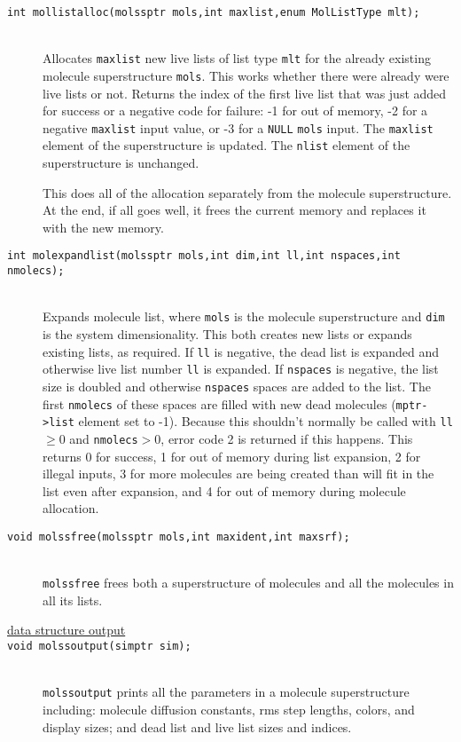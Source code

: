 \documentclass {scrbook}
\newcommand {\ttt} {\texttt}
\begin{document}
\begin{description}
\item[\ttt{int mollistalloc(molssptr mols,int maxlist,enum MolListType mlt);}]
\hfill \\
Allocates \ttt{maxlist} new live lists of list type \ttt{mlt} for the already existing molecule superstructure \ttt{mols}. This works whether there were already were live lists or not. Returns the index of the first live list that was just added for success or a negative code for failure: -1 for out of memory, -2 for a negative \ttt{maxlist} input value, or -3 for a \ttt{NULL} \ttt{mols} input. The \ttt{maxlist} element of the superstructure is updated. The \ttt{nlist} element of the superstructure is unchanged.

This does all of the allocation separately from the molecule superstructure. At the end, if all goes well, it frees the current memory and replaces it with the new memory.

\item[\ttt{int molexpandlist(molssptr mols,int dim,int ll,int nspaces,int nmolecs);}]
\hfill \\
Expands molecule list, where \ttt{mols} is the molecule superstructure and \ttt{dim} is the system dimensionality. This both creates new lists or expands existing lists, as required. If \ttt{ll} is negative, the dead list is expanded and otherwise live list number \ttt{ll} is expanded. If \ttt{nspaces} is negative, the list size is doubled and otherwise \ttt{nspaces} spaces are added to the list. The first \ttt{nmolecs} of these spaces are filled with new dead molecules (\ttt{mptr->list} element set to -1). Because this shouldn't normally be called with \ttt{ll}$\ge$0 and \ttt{nmolecs}$>$0, error code 2 is returned if this happens. This returns 0 for success, 1 for out of memory during list expansion, 2 for illegal inputs, 3 for more molecules are being created than will fit in the list even after expansion, and 4 for out of memory during molecule allocation.

\item[\ttt{void molssfree(molssptr mols,int maxident,int maxsrf);}]
\hfill \\
\ttt{molssfree} frees both a superstructure of molecules and all the molecules in all its lists.

\item[\underline{data structure output}]

\item[\ttt{void molssoutput(simptr sim);}]
\hfill \\
\ttt{molssoutput} prints all the parameters in a molecule superstructure including: molecule diffusion constants, rms step lengths, colors, and display sizes; and dead list and live list sizes and indices.


\end{description}
\end{document}
